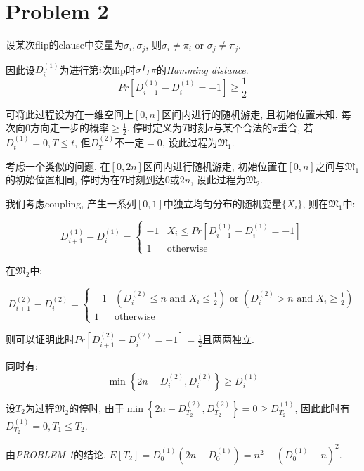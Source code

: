 \documentclass[paper=a4, fontsize=11pt]{scrartcl} %
\numberwithin{figure}{section} %
\numberwithin{table}{section} %
\begin{document}
\section*{Problem 2}
	设某次flip的clause中变量为$\sigma_i, \sigma_j$, 则$\sigma_i\not= \pi_i \textrm{ or } \sigma_j \not= \pi_j$.

	因此设$D^{(1)}_i$为进行第$i$次flip时$\sigma$与$\pi$的\textit{Hamming distance}.
	$$\textit{Pr}\left[D^{(1)}_{i + 1} - D^{(1)}_{i} = -1\right] \geq \frac{1}{2} $$

	可将此过程设为在一维空间上$[0, n]$区间内进行的随机游走, 且初始位置未知, 每次向$0$方向走一步的概率$\geq\frac{1}{2}$. 停时定义为$T$时刻$\sigma$与某个合法的$\pi$重合, 若$D^{(1)}_t=0, T\leq t$, 但$D^{(2)}_T$不一定$=0$, 设此过程为$\mathfrak{M}_1$.

	考虑一个类似的问题, 在$[0, 2n]$区间内进行随机游走, 初始位置在$[0, n]$之间与$\mathfrak{M}_1$的初始位置相同, 停时为在$T$时刻到达$0$或$2n$, 设此过程为$\mathfrak{M}_2$.

	我们考虑coupling, 产生一系列$[0,1]$中独立均匀分布的随机变量$\{X_i\}$, 则在$\mathfrak{M}_1$中:

	$$ D^{(1)}_{i+1} - D^{(1)}_{i} = 
	\left\{
	\begin{array}{ll}
	-1  & X_i\leq \textit{Pr}\left[D^{(1)}_{i+1} - D^{(1)}_{i} = -1\right] \\
	1	& \textrm{otherwise}
	\end{array}
	\right.
	 $$

	在$\mathfrak{M}_2$中:

	$$ D^{(2)}_{i+1} - D^{(2)}_{i} =
	\left\{
	\begin{array}{ll}
	-1 & \left(D^{(2)}_i \leq n \textrm{ and } X_i\leq \frac{1}{2} 
		 \right) \textrm{ or }
		 \left(D^{(2)}_i > n    \textrm{ and } X_i\geq \frac{1}{2}
		 \right) \\
	1  & \textrm{otherwise} 
	\end{array}
	\right. 
	$$

	则可以证明此时$Pr\left[D^{(2)}_{i+1} - D^{(2)}_{i} = -1 \right] = \frac{1}{2}$且两两独立.

	同时有:$$\min\left\{2n - D^{(2)}_{i}, D^{(2)}_{i}\right\} \geq D^{(1)}_{i} $$

	设$T_2$为过程$\mathfrak{M}_2$的停时, 由于$\min\left\{2n - D^{(2)}_{T_2}, D^{(2)}_{T_2}\right\} = 0 \geq D^{(1)}_{T_2}$, 因此此时有$D^{(1)}_{T_2} = 0, T_1\leq T_2$.

	由\textit{PROBLEM 1}的结论, $E[T_2] = D^{(1)}_0\left(2n - D^{(1)}_0\right) = n ^ 2 - \left(D^{(1)}_0 - n\right)^2$.
\end{document}
